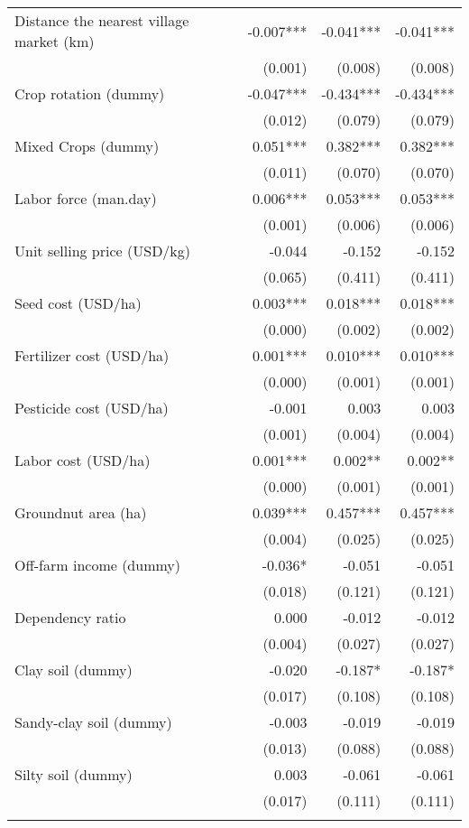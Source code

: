 \documentclass[
]{article}
\begin{document}
\begin{longtable}[t]{lrrr}
Distance the nearest village market (km) & -0.007*** & -0.041*** & -0.041***\\
 & (0.001) & (0.008) & (0.008)\\
Crop rotation (dummy) & -0.047*** & -0.434*** & -0.434***\\
 & (0.012) & (0.079) & (0.079)\\
Mixed Crops (dummy) & 0.051*** & 0.382*** & 0.382***\\
\addlinespace
 & (0.011) & (0.070) & (0.070)\\
Labor force (man.day) & 0.006*** & 0.053*** & 0.053***\\
 & (0.001) & (0.006) & (0.006)\\
Unit selling price (USD/kg) & -0.044 & -0.152 & -0.152\\
 & (0.065) & (0.411) & (0.411)\\
\addlinespace
Seed cost (USD/ha) & 0.003*** & 0.018*** & 0.018***\\
 & (0.000) & (0.002) & (0.002)\\
Fertilizer cost (USD/ha) & 0.001*** & 0.010*** & 0.010***\\
 & (0.000) & (0.001) & (0.001)\\
Pesticide cost (USD/ha) & -0.001 & 0.003 & 0.003\\
\addlinespace
 & (0.001) & (0.004) & (0.004)\\
Labor cost (USD/ha) & 0.001*** & 0.002** & 0.002**\\
 & (0.000) & (0.001) & (0.001)\\
Groundnut area (ha) & 0.039*** & 0.457*** & 0.457***\\
 & (0.004) & (0.025) & (0.025)\\
\addlinespace
Off-farm income (dummy) & -0.036* & -0.051 & -0.051\\
 & (0.018) & (0.121) & (0.121)\\
Dependency ratio & 0.000 & -0.012 & -0.012\\
 & (0.004) & (0.027) & (0.027)\\
Clay soil (dummy) & -0.020 & -0.187* & -0.187*\\
\addlinespace
 & (0.017) & (0.108) & (0.108)\\
Sandy-clay soil (dummy) & -0.003 & -0.019 & -0.019\\
 & (0.013) & (0.088) & (0.088)\\
Silty soil (dummy) & 0.003 & -0.061 & -0.061\\
 & (0.017) & (0.111) & (0.111)\\
\addlinespace

\end{longtable}
\end{document}
